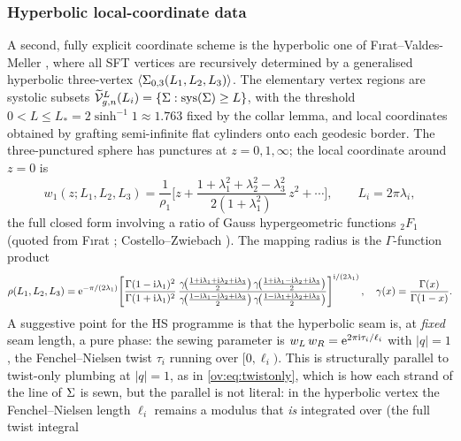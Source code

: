 \subsubsection{Hyperbolic local-coordinate data}
\label{ov:sec:explicit:hyp}

A second, fully explicit coordinate scheme is the hyperbolic one of F{\i}rat--Valdes-Meller
\cite{FiratValdesMeller2024}, where all SFT vertices are recursively determined by a
generalised hyperbolic three-vertex $\left \langle \Sigma_{0,3}(L_1,L_2,L_3) \right \rangle$. The elementary vertex
regions are systolic subsets $\widetilde{{\mathcal{V}}}^L_{g,n}(L_i)=\{\Sigma:\operatorname{sys}(\Sigma)\ge L\}$,
with the threshold $0<L\le L_*=2\sinh^{-1}1\approx1.763$ fixed by the collar lemma, and local
coordinates obtained by grafting semi-infinite flat cylinders onto each geodesic border. The
three-punctured sphere has punctures at $z=0,1,\infty$; the local coordinate around $z=0$ is
\begin{equation}
	w_1(z;L_1,L_2,L_3)=\frac{1}{\rho_1}\Big[z+\frac{1+\lambda_1^2+\lambda_2^2-\lambda_3^2}
	{2(1+\lambda_1^2)}\,z^2+\cdots\Big],\qquad L_i=2\pi\lambda_i,
	\label{ov:eq:hypcoord}
\end{equation}
the full closed form involving a ratio of Gauss hypergeometric functions ${}_2F_1$
(quoted from F{\i}rat \cite{Firat2021}; Costello--Zwiebach \cite{CostelloZwiebach2022}). The
mapping radius is the $\Gamma$-function product
\begin{equation}
	\rho(L_1,L_2,L_3)=\mathrm{e}^{-\pi/(2\lambda_1)}\!\left[
	\frac{\Gamma(1-\mathrm{i}\lambda_1)^2}{\Gamma(1+\mathrm{i}\lambda_1)^2}\,
	\frac{\gamma\!\big(\tfrac{1+\mathrm{i}\lambda_1+\mathrm{i}\lambda_2+\mathrm{i}\lambda_3}{2}\big)\,
	\gamma\!\big(\tfrac{1+\mathrm{i}\lambda_1-\mathrm{i}\lambda_2+\mathrm{i}\lambda_3}{2}\big)}
	{\gamma\!\big(\tfrac{1-\mathrm{i}\lambda_1-\mathrm{i}\lambda_2+\mathrm{i}\lambda_3}{2}\big)\,
	\gamma\!\big(\tfrac{1-\mathrm{i}\lambda_1+\mathrm{i}\lambda_2+\mathrm{i}\lambda_3}{2}\big)}\right]^{\mathrm{i}/(2\lambda_1)},
	\quad \gamma(x)=\frac{\Gamma(x)}{\Gamma(1-x)}.
	\label{ov:eq:rho}
\end{equation}
 A suggestive point for the HS programme is that the hyperbolic seam is, at \emph{fixed}
seam length, a pure phase: the sewing parameter is $w_L\,w_R=\mathrm{e}^{2\pi\mathrm{i}\tau_i/\ell_i}$ with
$|q|=1$, the Fenchel--Nielsen twist $\tau_i$ running over $[0,\ell_i)$. This is structurally
parallel to twist-only plumbing at $|q|=1$, as in \eqref{ov:eq:twistonly}, which is how each strand of the line of $\Sigma$ is sewn,
but the parallel is not literal: in the hyperbolic vertex the Fenchel--Nielsen length $\ell_i$
remains a modulus that \emph{is} integrated over (the full twist integral
